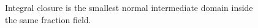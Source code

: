 \begin{figure}[htbp]\centering
{}
\caption{Integral closure is the smallest normal intermediate domain inside the same fraction field.}\label{fig:vi28-closure}\end{figure}

